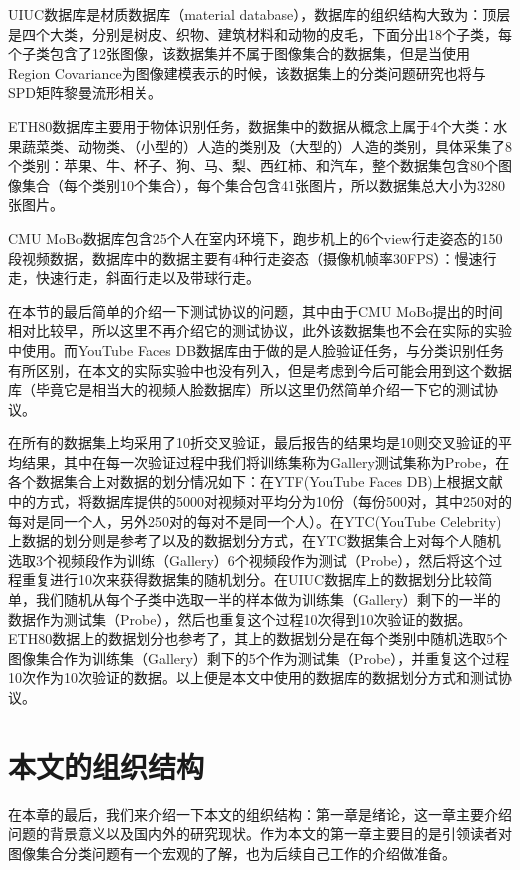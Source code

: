 UIUC数据库\cite{Database_UIUC}是材质数据库（material database），数据库的组织结构大致为：顶层是四个大类，分别是树皮、织物、建筑材料和动物的皮毛，下面分出18个子类，每个子类包含了12张图像，该数据集并不属于图像集合的数据集，但是当使用Region Covariance\cite{RegionCov}为图像建模表示的时候，该数据集上的分类问题研究也将与SPD矩阵黎曼流形相关。

ETH80数据库\cite{Database_ETH80}主要用于物体识别任务，数据集中的数据从概念上属于4个大类：水果蔬菜类、动物类、（小型的）人造的类别及（大型的）人造的类别，具体采集了8个类别：苹果、牛、杯子、狗、马、梨、西红柿、和汽车，整个数据集包含80个图像集合（每个类别10个集合），每个集合包含41张图片，所以数据集总大小为3280张图片。

CMU MoBo数据库\cite{Database_MoBo}包含25个人在室内环境下，跑步机上的6个view行走姿态的150段视频数据，数据库中的数据主要有4种行走姿态（摄像机帧率30FPS）：慢速行走，快速行走，斜面行走以及带球行走。

在本节的最后简单的介绍一下测试协议的问题，其中由于CMU MoBo\cite{Database_MoBo}提出的时间相对比较早，所以这里不再介绍它的测试协议，此外该数据集也不会在实际的实验中使用。而YouTube Faces DB数据库由于做的是人脸验证任务，与分类识别任务有所区别，在本文的实际实验中也没有列入，但是考虑到今后可能会用到这个数据库（毕竟它是相当大的视频人脸数据库）所以这里仍然简单介绍一下它的测试协议。

在所有的数据集上均采用了10折交叉验证，最后报告的结果均是10则交叉验证的平均结果，其中在每一次验证过程中我们将训练集称为Gallery测试集称为Probe，在各个数据集合上对数据的划分情况如下：在YTF(YouTube Faces DB)上根据文献\cite{Database_YTF}中的方式，将数据库提供的5000对视频对平均分为10份（每份500对，其中250对的每对是同一个人，另外250对的每对不是同一个人）。在YTC(YouTube Celebrity\cite{Database_YTC})上数据的划分则是参考了\cite{Statistics_CDL}以及\cite{Statistics_Vemu}的数据划分方式，在YTC数据集合上对每个人随机选取3个视频段作为训练（Gallery）6个视频段作为测试（Probe），然后将这个过程重复进行10次来获得数据集的随机划分。在UIUC数据库\cite{Database_UIUC}上的数据划分比较简单，我们随机从每个子类中选取一半的样本做为训练集（Gallery）剩下的一半的数据作为测试集（Probe），然后也重复这个过程10次得到10次验证的数据。ETH80数据上的数据划分也参考了\cite{Statistics_CDL}，其上的数据划分是在每个类别中随机选取5个图像集合作为训练集（Gallery）剩下的5个作为测试集（Probe），并重复这个过程10次作为10次验证的数据。以上便是本文中使用的数据库的数据划分方式和测试协议。
\section{本文的组织结构}
\label{sec:struct}
在本章的最后，我们来介绍一下本文的组织结构：第一章是绪论，这一章主要介绍问题的背景意义以及国内外的研究现状。作为本文的第一章主要目的是引领读者对图像集合分类问题有一个宏观的了解，也为后续自己工作的介绍做准备。

